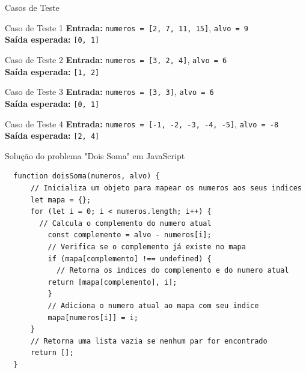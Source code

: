 \begin{frame}{Casos de Teste}
  \begin{block}{Caso de Teste 1}
      \textbf{Entrada:} \texttt{numeros = [2, 7, 11, 15]}, \texttt{alvo = 9}\\
      \textbf{Saída esperada:} \texttt{[0, 1]}
  \end{block}

  \begin{block}{Caso de Teste 2}
      \textbf{Entrada:} \texttt{numeros = [3, 2, 4]}, \texttt{alvo = 6}\\
      \textbf{Saída esperada:} \texttt{[1, 2]}
  \end{block}

  \begin{block}{Caso de Teste 3}
      \textbf{Entrada:} \texttt{numeros = [3, 3]}, \texttt{alvo = 6}\\
      \textbf{Saída esperada:} \texttt{[0, 1]}
  \end{block}

  \begin{block}{Caso de Teste 4}
      \textbf{Entrada:} \texttt{numeros = [-1, -2, -3, -4, -5]}, \texttt{alvo = -8}\\
      \textbf{Saída esperada:} \texttt{[2, 4]}
  \end{block}
\end{frame}
\begin{frame}[fragile]{Solução do problema "Dois Soma" em JavaScript}
  \small
  \begin{lstlisting}
  function doisSoma(numeros, alvo) {
      // Inicializa um objeto para mapear os numeros aos seus indices
      let mapa = {}; 
      for (let i = 0; i < numeros.length; i++) {
        // Calcula o complemento do numero atual
          const complemento = alvo - numeros[i]; 
          // Verifica se o complemento já existe no mapa
          if (mapa[complemento] !== undefined) {
            // Retorna os indices do complemento e do numero atual    
          return [mapa[complemento], i]; 
          }
          // Adiciona o numero atual ao mapa com seu indice
          mapa[numeros[i]] = i; 
      }
      // Retorna uma lista vazia se nenhum par for encontrado
      return []; 
  }
  \end{lstlisting}
\end{frame}


